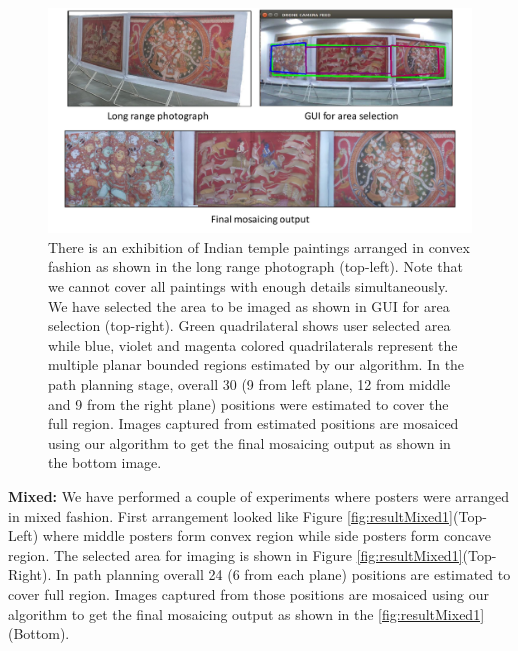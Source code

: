 \begin{figure}[t!]
\centering
\includegraphics[width=\linewidth]{figures/multiplanar/convexResult.pdf}
\caption[Result: Convex arrangement]{There is an exhibition of Indian temple
paintings arranged in convex fashion as shown in the long range photograph (top-left). Note that we
cannot cover all paintings with enough details simultaneously. We have selected
the area to be imaged as shown in GUI for area selection (top-right).
Green quadrilateral shows user selected area while blue, violet and magenta
colored quadrilaterals represent the multiple planar bounded regions
estimated by our algorithm. In the path planning stage, overall 30 (9 from left
plane, 12 from middle and 9 from the right plane) positions were estimated to cover
the full region. Images captured from estimated positions are mosaiced using our
algorithm to get the final mosaicing output as shown in the bottom image.}
\label{fig:resultConvex}
\end{figure}

\textbf{Mixed:} We have performed a couple of experiments where posters were
arranged in mixed fashion. First arrangement looked like Figure
\ref{fig:resultMixed1}(Top-Left) where middle posters form convex region while
side posters form concave region. The selected area for imaging is shown in
Figure \ref{fig:resultMixed1}(Top-Right). In path planning overall 24 (6 from each
plane) positions are estimated to cover full region. Images captured from
those positions are mosaiced using our algorithm to get the final mosaicing
output as shown in the \ref{fig:resultMixed1}(Bottom).

